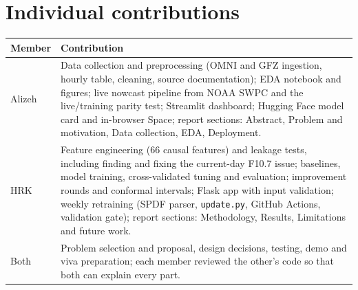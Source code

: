 \documentclass[11pt,a4paper]{article}
\newcommand{\code}[1]{\texttt{\small #1}}
\begin{document}
\section*{Individual contributions}
{\small\centering
\begin{tabular}{@{}p{2cm}p{14.5cm}@{}}\toprule
Member & Contribution\\\midrule
Alizeh & Data collection and preprocessing (OMNI and GFZ ingestion, hourly table, cleaning, source
documentation); EDA notebook and figures; live nowcast pipeline from NOAA SWPC and the live/training parity test;
Streamlit dashboard; Hugging Face model card and in-browser Space; report sections: Abstract, Problem and motivation,
Data collection, EDA, Deployment.\\\addlinespace
HRK & Feature engineering (66 causal features) and leakage tests, including finding and fixing the current-day F10.7
issue; baselines, model training, cross-validated tuning and evaluation; improvement rounds and conformal intervals;
Flask app with input validation; weekly retraining (SPDF parser, \code{update.py}, GitHub Actions, validation gate);
report sections: Methodology, Results, Limitations and future work.\\\addlinespace
Both & Problem selection and proposal, design decisions, testing, demo and viva preparation; each member reviewed
the other's code so that both can explain every part.\\\bottomrule
\end{tabular}\par}
\end{document}
